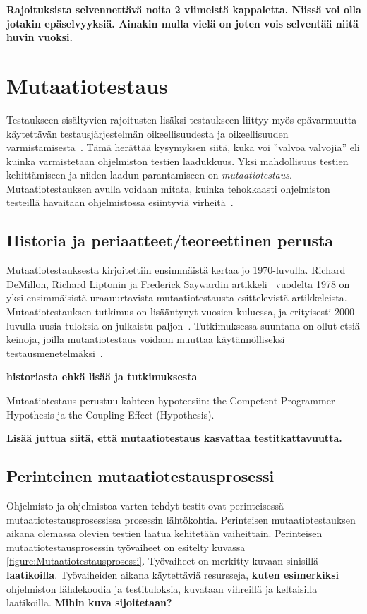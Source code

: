 \documentclass[finnish, grading]{tktltiki2}
\theoremstyle{definition}
\theoremstyle{remark}
\begin{document}
\textbf{Rajoituksista selvennettävä noita 2 viimeistä kappaletta. Niissä voi olla jotakin epäselvyyksiä. Ainakin mulla vielä on joten vois selventää niitä huvin vuoksi.}

\section{Mutaatiotestaus}

Testaukseen sisältyvien rajoitusten lisäksi testaukseen liittyy myös epävarmuutta käytettävän testausjärjestelmän oikeellisuudesta ja oikeellisuuden varmistamisesta~\cite[s. 209]{Manna:Waldinger:1978}. Tämä herättää kysymyksen siitä, kuka voi ''valvoa valvojia'' eli kuinka varmistetaan ohjelmiston testien laadukkuus. Yksi mahdollisuus testien kehittämiseen ja niiden laadun parantamiseen on \textit{mutaatiotestaus}. Mutaatiotestauksen avulla voidaan mitata, kuinka tehokkaasti ohjelmiston testeillä havaitaan ohjelmistossa esiintyviä virheitä~\cite[s. 649]{Jia:Harman:2011}.

\subsection{Historia ja periaatteet/teoreettinen perusta}

Mutaatiotestauksesta kirjoitettiin ensimmäistä kertaa jo 1970-luvulla. Richard DeMillon, Richard Liptonin ja Frederick Saywardin artikkeli~\cite{DeMillo:Lipton:Sayward:1978} vuodelta 1978 on yksi ensimmäisistä uraauurtavista mutaatiotestausta esittelevistä artikkeleista. Mutaatiotestauksen tutkimus on lisääntynyt vuosien kuluessa, ja erityisesti 2000-luvulla uusia tuloksia on julkaistu paljon~\cite[s. 1102]{Offutt:2011}. Tutkimuksessa suuntana on ollut etsiä keinoja, joilla mutaatiotestaus voidaan muuttaa käytännölliseksi testausmenetelmäksi~\cite[s. 649]{Jia:Harman:2011}. 

\textbf{historiasta ehkä lisää ja tutkimuksesta}

Mutaatiotestaus perustuu kahteen hypoteesiin: the Competent Programmer Hypothesis ja the Coupling Effect (Hypothesis).

\textbf{Lisää juttua siitä, että mutaatiotestaus kasvattaa testitkattavuutta.}

\subsection{Perinteinen mutaatiotestausprosessi}

Ohjelmisto ja ohjelmistoa varten tehdyt testit ovat perinteisessä mutaatiotestausprosessissa prosessin lähtökohtia. Perinteisen mutaatiotestauksen aikana olemassa olevien testien laatua kehitetään vaiheittain. Perinteisen mutaatiotestausprosessin työvaiheet on esitelty kuvassa \ref{figure:Mutaatiotestausprosessi}. Työvaiheet on merkitty kuvaan sinisillä \textbf{laatikoilla}. Työvaiheiden aikana käytettäviä resursseja, \textbf{kuten esimerkiksi} ohjelmiston lähdekoodia ja testituloksia, kuvataan vihreillä ja keltaisilla laatikoilla. \textbf{Mihin kuva sijoitetaan?}
\end{document}
